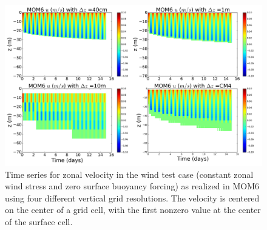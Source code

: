 \begin{figure}[h!t]
\begin{center}
\includegraphics[angle=0,width=14cm]{./figs/MOM6/wind_only_KPP_MOM6_zonal_velocity.png}
\caption[Zonal velocity from MOM6 for winds-alone test]{\sf Time
  series for zonal velocity in the wind test case (constant zonal wind
  stress and zero surface buoyancy forcing) as realized in MOM6 using
  four different vertical grid resolutions. The velocity is centered
  on the center of a grid cell, with the first nonzero value at the
  center of the surface cell.}
\label{fig:MOM6_zonal-wind_alone}
\end{center}
\end{figure}





